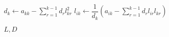 \documentclass[varwidth]{standalone}
\begin{document}
\begin{algorithmic}[1]

	\State $d_k \gets a_{kk} - \displaystyle\sum_{r=1}^{k-1}d_{r}l_{kr}^2$
		\State $l_{ik} \gets \dfrac{1}{d_k}\left(a_{ik} - \displaystyle\sum_{r=1}^{k-1}d_{r}l_{ir}l_{kr} \right)$
	\EndFor
\EndFor

\State \Return $L, D$

\EndFunction
\end{algorithmic}
\end{document}
